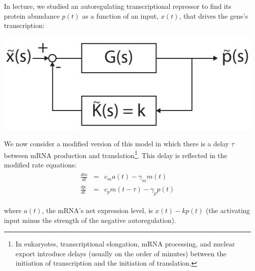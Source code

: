 \documentclass{article}
\begin{document}
In lecture, we studied an autoregulating transcriptional repressor to find its protein abundance $p(t)$ as a function of an input, $x(t)$, that drives the gene's transcription:

\begin{center}\includegraphics[width=0.4 \textwidth]{autorepression.pdf}\end{center}

We now consider a modified version of this model in which there is a delay $\tau$ between mRNA production and translation\footnote{In eukaryotes, transcriptional elongation, mRNA processing, and nuclear export introduce delays (usually on the order of minutes) between the initiation of transcription and the initiation of translation.}. This delay is reflected in the modified rate equations:
\begin{eqnarray}
\begin{aligned}
\frac{d m}{dt} & = & c_m a(t) - \gamma_m m(t)\\
\frac{d p}{d t} & = & c_p m(t-\tau) - \gamma_p p(t) \label{eqn:rateequations}
\end{aligned}
\end{eqnarray}

\noindent where $a(t)$, the mRNA's net expression level, is $x(t)-k p(t)$ (the activating input minus the strength of the negative autoregulation).
\end{document}
